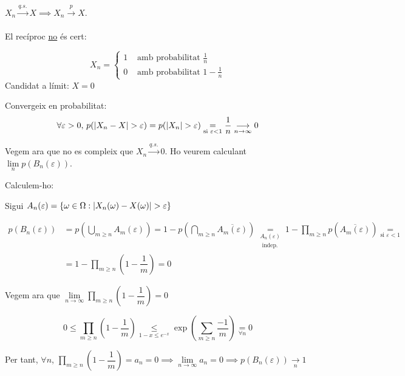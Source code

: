 \begin{prop}[(IV)]
  $X_n \overset{q.s.}{\to} X \implies X_n \overset{p}{\to} X$. \\\\
  
  El recíproc \underline{no} és cert:
  
  \[
    X_n = \begin{cases}
      1 &\text{ amb probabilitat } \frac{1}{n}\\
      0 &\text{ amb probabilitat } 1 - \frac{1}{n}
    \end{cases}
  \]
  Candidat a límit: $X=0$
  
  Convergeix en probabilitat: 
  $$\forall \varepsilon > 0, \, p(\left\vert X_n - X \right\vert > \varepsilon) = p(\left\vert X_n \right\vert>\varepsilon) 
  \underset{\text{si } \varepsilon < 1}{=} \frac{1}{n} \underset{n \to \infty}{\longrightarrow} 0$$
  
  Vegem ara que no es compleix que $X_n \overset{q.s.}{\to} 0$. Ho veurem calculant $\lim\limits_{n} 
  p(B_n(\varepsilon))$.
  
  Calculem-ho:
  
  Sigui $A_n(\varepsilon) = \left\{\omega \in \Omega : \left\vert X_n(\omega) - X(\omega) \right\vert > \varepsilon\right\}$
  
    \begin{align*}
        p(B_n(\varepsilon)) &= p\left(\bigcup_{m\geq n}A_m(\varepsilon)\right) = 
        1 - p\left(\bigcap_{m\geq n}\overline{A_m(\varepsilon)}\right) \underset{\substack{A_n(\varepsilon) \\ 
        \text{ indep.}}}{=} 1 - \prod_{m\geq n}{p\left(\overline{A_m(\varepsilon)} \right)} \underset{\text{si } 
        \varepsilon < 1}{=}\\
        &= 1 - \prod_{m\geq n}\left(1-\dfrac{1}{m} \right) = 0
    \end{align*}
    
    Vegem ara que $\lim\limits_{n\to \infty}\displaystyle\prod_{m\geq n}\left(1-\dfrac{1}{m} \right) = 0$
    
    \[
      0 \leq \prod_{m\geq n}\left(1-\dfrac{1}{m} \right) \underset{1-x\leq e^{-x}}{\leq} 
      \exp\left(\sum_{m\geq n}\frac{-1}{m}\right) \underset{\forall n}{=} 0
    \]
    
    Per tant, $\forall n$, $\displaystyle\prod_{m\geq n}\left(1-\dfrac{1}{m} \right) = a_n = 0 
    \implies \lim\limits_{n\to \infty} a_n = 0 \implies p(B_n(\varepsilon)) \underset{n}{\longrightarrow} 1$
\end{prop}

